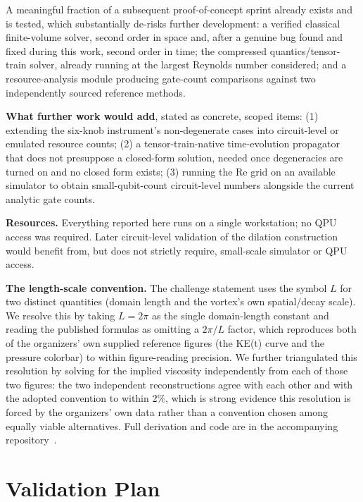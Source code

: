 \documentclass[10.5pt,twocolumn]{article}
\begin{document}
A meaningful fraction of a subsequent proof-of-concept sprint already exists and is tested, which substantially de-risks further development: a verified classical finite-volume solver, second order in space and, after a genuine bug found and fixed during this work, second order in time; the compressed quantics/tensor-train solver, already running at the largest Reynolds number considered; and a resource-analysis module producing gate-count comparisons against two independently sourced reference methods.

\textbf{What further work would add}, stated as concrete, scoped items: (1) extending the six-knob instrument's non-degenerate cases into circuit-level or emulated resource counts; (2) a tensor-train-native time-evolution propagator that does not presuppose a closed-form solution, needed once degeneracies are turned on and no closed form exists; (3) running the Re grid on an available simulator to obtain small-qubit-count circuit-level numbers alongside the current analytic gate counts.

\textbf{Resources.} Everything reported here runs on a single workstation; no QPU access was required. Later circuit-level validation of the dilation construction would benefit from, but does not strictly require, small-scale simulator or QPU access.

\textbf{The length-scale convention.} The challenge statement uses the symbol $L$ for two distinct quantities (domain length and the vortex's own spatial/decay scale). We resolve this by taking $L=2\pi$ as the single domain-length constant and reading the published formulas as omitting a $2\pi/L$ factor, which reproduces both of the organizers' own supplied reference figures (the KE(t) curve and the pressure colorbar) to within figure-reading precision. We further triangulated this resolution by solving for the implied viscosity independently from each of those two figures: the two independent reconstructions agree with each other and with the adopted convention to within 2\%, which is strong evidence this resolution is forced by the organizers' own data rather than a convention chosen among equally viable alternatives. Full derivation and code are in the accompanying repository~\cite{tgx2026}.

\section{Validation Plan}
\end{document}
